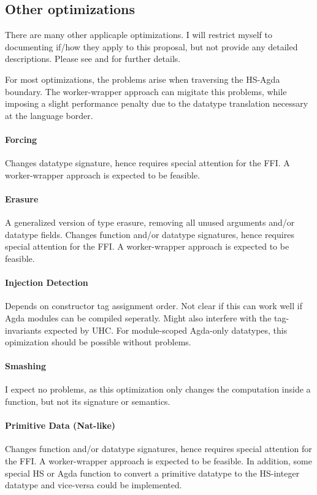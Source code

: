 \documentclass[12pt, a4paper, twoside]{report}
\begin{document}
\subsection{Other optimizations}
There are many other applicaple optimizations. I will restrict myself to documenting if/how they apply to this proposal,
but not provide any detailed descriptions. Please see \cite{fredriksson2011totaly} and \cite{Brady-store-indices2004}
for further details.

For most optimizations, the problems arise when traversing the HS-Agda boundary. The worker-wrapper
approach can migitate this problems, while imposing a slight performance penalty due to the
datatype translation necessary at the language border.
\paragraph{Forcing}
Changes datatype signature, hence requires special attention for the FFI.
A worker-wrapper approach is expected to be feasible.

\paragraph{Erasure}
A generalized version of type erasure, removing all unused arguments and/or datatype fields.
Changes function and/or datatype signatures, hence requires special attention for the FFI.
A worker-wrapper approach is expected to be feasible.

\paragraph{Injection Detection}
Depends on constructor tag assignment order. Not clear if this can work well if Agda modules can be compiled
seperatly. Might also interfere with the tag-invariants expected by UHC.
For module-scoped Agda-only datatypes, this opimization should be possible without
problems.

\paragraph{Smashing}
I expect no problems, as this optimization only changes the computation inside a function, but not
its signature or semantics.

\paragraph{Primitive Data (Nat-like)}
Changes function and/or datatype signatures, hence requires special attention for the FFI.
A worker-wrapper approach is expected to be feasible. In addition, some special
HS or Agda function to convert a primitive datatype to the HS-integer datatype and vice-versa could be
implemented.
\end{document}
